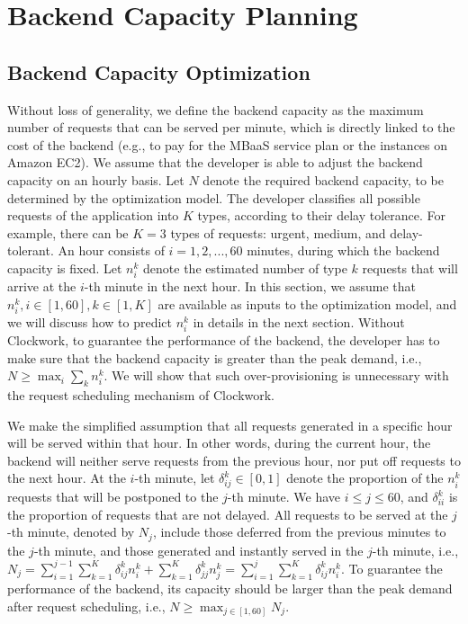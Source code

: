 \section{Backend Capacity Planning} \label{sec:theory}




     

\subsection{Backend Capacity Optimization}\label{sec:plan}

Without loss of generality, we define the backend capacity as the maximum number of requests that can be served per minute, which is directly linked to the cost of the backend (e.g., to pay for the MBaaS service plan or the instances on Amazon EC2). We assume that the developer is able to adjust the backend capacity on an hourly basis. Let $N$ denote the required backend capacity, to be determined by the optimization model. The developer classifies all possible requests of the application into $K$ types, according to their delay tolerance. For example, there can be $K=3$ types of requests: urgent, medium, and delay-tolerant. An hour consists of $i = 1,2,...,60$ minutes, during which the backend capacity is fixed. Let $n_i^k$ denote the estimated number of type $k$ requests that will arrive at the $i$-th minute in the next hour. In this section, we assume that  $n_i^k, i\in[1,60], k \in[1,K]$ are available as inputs to the optimization model, and we will discuss how to predict $n_i^k$ in details in the next section. Without Clockwork, to guarantee the performance of the backend, the developer has to make sure that the backend capacity is greater than the peak demand, i.e., $N \ge \max_i\sum_k n_i^k$. We will show that such over-provisioning is unnecessary with the request scheduling mechanism of Clockwork.  


We make the simplified assumption that all requests generated in a specific hour will be served within that hour. In other words, during the current hour, the backend will neither serve requests from the previous hour, nor put off requests to the next hour. At the $i$-th minute, let $\delta_{ij}^k \in [0,1]$ denote the proportion of the $n_i^k$ requests that will be postponed to the $j$-th minute. We have $i \le j \le 60$, and $\delta_{ii}^k$ is the proportion of requests that are not delayed.  All requests to be served at the $j$-th minute, denoted by $N_j$, include those deferred from the previous minutes to the $j$-th minute, and those generated and instantly served in the $j$-th minute, i.e., $N_j = \sum_{i=1}^{j-1}\sum_{k=1}^K\delta_{ij}^k n_i^k + \sum_{k=1}^K\delta_{jj}^k n_j^k = \sum_{i=1}^{j}\sum_{k=1}^K\delta_{ij}^k n_i^k$. To guarantee the performance of the backend, its capacity should be larger than the peak demand after request scheduling, i.e., $N \ge \max_{j\in[1,60]}N_j$. 

